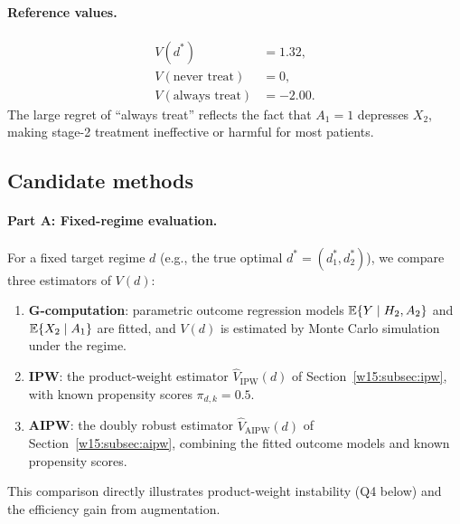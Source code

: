 \documentclass[master.tex]{subfiles}
\begin{document}
\paragraph{Reference values.}
\begin{align*}
  V(d^*)        &= 1.32, \\
  V(\text{never treat}) &= 0, \\
  V(\text{always treat}) &= -2.00.
\end{align*}
The large regret of ``always treat'' reflects the fact that $A_1 = 1$
depresses $X_2$, making stage-2 treatment ineffective or harmful for most
patients.

\subsection{Candidate methods}
\label{w15:sec:lab:methods}

\paragraph{Part A: Fixed-regime evaluation.}
For a fixed target regime $d$ (e.g., the true optimal $d^* = (d_1^*, d_2^*)$), we compare three estimators of $V(d)$:
\begin{enumerate}
  \item \textbf{G-computation}: parametric outcome regression models $\mathbb{E}\{Y \mid H_2, A_2\}$ and $\mathbb{E}\{X_2 \mid A_1\}$ are fitted, and $V(d)$ is estimated by Monte Carlo simulation under the regime.
  \item \textbf{IPW}: the product-weight estimator $\widehat{V}_{\mathrm{IPW}}(d)$ of Section~\ref{w15:subsec:ipw}, with known propensity scores $\pi_{d,k} = 0.5$.
  \item \textbf{AIPW}: the doubly robust estimator $\widehat{V}_{\mathrm{AIPW}}(d)$ of Section~\ref{w15:subsec:aipw}, combining the fitted outcome models and known propensity scores.
\end{enumerate}
This comparison directly illustrates product-weight instability (Q4 below) and the efficiency gain from augmentation.
\end{document}
